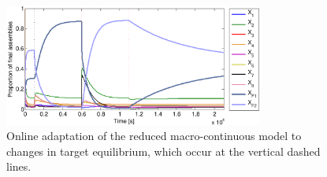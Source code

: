     \begin{figure}[t]
        \centering
            \includegraphics[width=8.5cm]{img/optim_online_adaptation.pdf}
        \caption{Online adaptation of the reduced macro-continuous model to changes in target equilibrium,
        which occur at the vertical dashed lines.}
        \label{fig:img_optim_online_adaptation}
    \end{figure}

